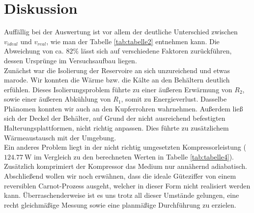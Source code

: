 \section{Diskussion}
\label{sec:Diskussion}
Auffällig bei der Auswertung ist vor allem der deutliche Unterschied zwischen $ v_{ideal} $ und $ v_{real} $, wie man der Tabelle \ref{tab:tabelle2} entnehmen kann.
Die Abweichung von ca. $82\%$ lässt sich auf verschiedene Faktoren zurückführen, dessen Ursprünge im Versuchsaufbau liegen.\\
Zunächst war die Isolierung der Reservoire an sich unzureichend und etwas marode.
Wir konnten die Wärme bzw. die Kälte an den Behältern deutlich erfühlen.
Dieses Isolierungsproblem führte zu einer äußeren Erwärmung von $R_2$, sowie einer äußeren Abkühlung von $R_1$, somit zu Energieverlust.
Dasselbe Phänomen konnten wir auch an den Kupferrohren wahrnehmen.
Außerdem ließ sich der Deckel der Behälter, auf Grund der nicht ausreichend befestigten Halterungsplattformen, nicht richtig anpassen.
Dies führte zu zusätzlichem Wärmeaustausch mit der Umgebung.\\
Ein anderes Problem liegt in der nicht richtig umgesetzten Kompressorleistung ($\SI{124,77}{\watt}$ im Vergleich zu den berechneten Werten in Tabelle \ref{tab:tabelle4}).
Zusätzlich komprimiert der Kompressor das Medium nur annähernd adiabatisch.\\
Abschließend wollen wir noch erwähnen, dass die ideale Güteziffer von einem reversiblen Carnot-Prozess ausgeht, welcher in dieser Form nicht realisiert werden kann.
Überraschenderweise ist es uns trotz all dieser Umstände gelungen, eine recht gleichmäßige Messung sowie eine planmäßige Durchführung zu erzielen.
